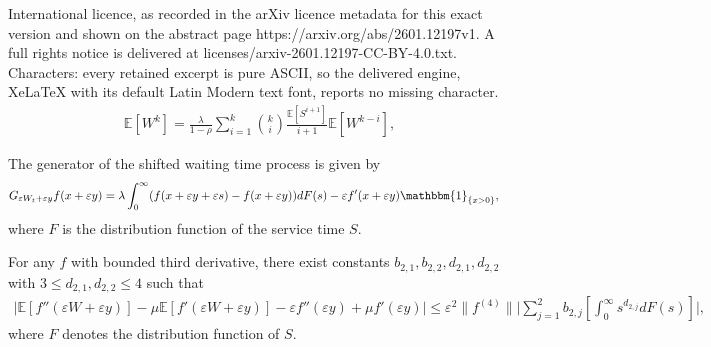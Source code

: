 \documentclass[10pt,a4paper]{amsart}
\begin{document}
International licence, as recorded in the arXiv licence metadata for this exact version and shown on the abstract page https://arxiv.org/abs/2601.12197v1. A full rights notice is delivered at licenses/arxiv-2601.12197-CC-BY-4.0.txt. Characters: every retained excerpt is pure ASCII, so the delivered engine, XeLaTeX with its default Latin Modern text font, reports no missing character.
\begin{align}\label{wtrecursion}
    \mathbb E[W^k] = \frac\lambda{1-\rho}\sum_{i=1}^k\binom ki \frac{\mathbb E[S^{i+1}]}{i+1}\mathbb E[W^{k-i}],
\end{align}

\begin{lemma}\label{lemma1}
The generator of the shifted waiting time process is given by
\begin{align}\label{gen}
    G_{\varepsilon W_t+\varepsilon y}f(x+\varepsilon y)&=\lambda \int_0^\infty (f(x+\varepsilon y +\varepsilon s)-f(x+\varepsilon y))dF(s)-\varepsilon f'(x+\varepsilon y)\mathbbm{1}_{\{x>0\}},
\end{align}
where $F$ is the distribution function of the service time $S$.
\end{lemma}

\begin{lemma}\label{Lemma k=2}
 For any $f$ with bounded third derivative, there exist constants $b_{2,1},b_{2,2},d_{2,1},d_{2,2}$ with  $3 \leq d_{2,1},d_{2,2} \leq 4$ such that 
    \begin{align*}
        \bigg|\mathbb E[f''(\varepsilon W+\varepsilon y)]-\mu \mathbb E[f'(\varepsilon W+\varepsilon y)]-\varepsilon f''(\varepsilon y)
     +\mu f'(\varepsilon y)\bigg|\leq \varepsilon^2 \|f^{(4)}\| \bigg|\sum_{j=1}^{2}b_{2,j}  \left[ \int_0^\infty s^{d_{2,j}}dF(s)\right]\bigg|,
    \end{align*}
where $F$ denotes the distribution function of $S$.
\end{lemma}
\end{document}

